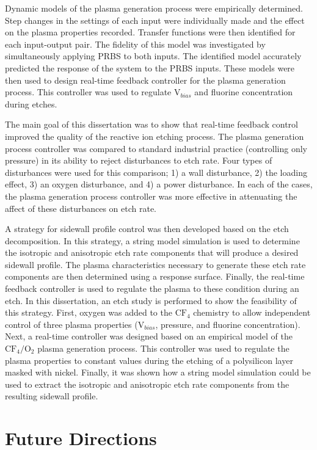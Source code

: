 Dynamic models of the plasma generation process were empirically determined. Step
changes in the settings of each input were individually made and the effect on the plasma
properties recorded. Transfer functions were then identified for each input-output pair. The
fidelity of this model was investigated by simultaneously applying PRBS to both inputs. The
identified model accurately predicted the response of the system to the PRBS inputs. These
models were then used to design real-time feedback controller for the plasma generation
process. This controller was used to regulate $\text{V}_{bias}$ and fluorine concentration during etches.

The main goal of this dissertation was to show that real-time feedback control improved
the quality of the reactive ion etching process. The plasma generation process controller was compared to standard industrial practice (controlling only pressure) in its ability to reject
disturbances to etch rate. Four types of disturbances were used for this comparison; 1) a wall
disturbance, 2) the loading effect, 3) an oxygen disturbance, and 4) a power disturbance. In
each of the cases, the plasma generation process controller was more effective in attenuating
the affect of these disturbances on etch rate.

A strategy for sidewall profile control was then developed based on the etch decomposition. In this strategy, a string model simulation is used to determine the isotropic and
anisotropic etch rate components that will produce a desired sidewall profile. The plasma
characteristics necessary to generate these etch rate components are then determined using
a response surface. Finally, the real-time feedback controller is used to regulate the plasma
to these condition during an etch. In this dissertation, an etch study is performed to show
the feasibility of this strategy. First, oxygen was added to the $\text{CF}_{4}$ chemistry to allow independent control of three plasma properties ($\text{V}_{bias}$, pressure, and fluorine concentration). Next, a real-time controller was designed based on an empirical model of the $\text{CF}_{4}/\text{O}_{2}$ plasma generation process. This controller was used to regulate the plasma properties to constant values during the etching of a polysilicon layer masked with nickel. Finally, it was shown how a string model simulation could be used to extract the isotropic and anisotropic etch rate components from the resulting sidewall profile.

\section{Future Directions}

